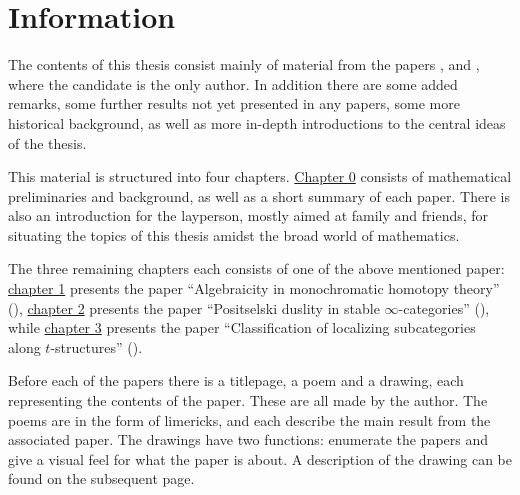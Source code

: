 
\section*{Information}

The contents of this thesis consist mainly of material from the papers \cite{aambo_2024_algebraicity}, \cite{aambo_2024_positselski} and \cite{aambo_2024_localizing}, where the candidate is the only author. In addition there are some added remarks, some further results not yet presented in any papers, some more historical background, as well as more in-depth introductions to the central ideas of the thesis. 

This material is structured into four chapters. \hyperref[ch0]{Chapter 0} consists of mathematical preliminaries and background, as well as a short summary of each paper. There is also an introduction for the layperson, mostly aimed at family and friends, for situating the topics of this thesis amidst the broad world of mathematics. 

The three remaining chapters each consists of one of the above mentioned paper: \hyperref[ch1]{chapter 1} presents the paper ``Algebraicity in monochromatic homotopy theory'' (\cite{aambo_2024_algebraicity}), \hyperref[ch2]{chapter 2} presents the paper ``Positselski duslity in stable $\infty$-categories'' (\cite{aambo_2024_positselski}), while \hyperref[ch3]{chapter 3} presents the paper ``Classification of localizing subcategories along $t$-structures'' (\cite{aambo_2024_localizing}). 

Before each of the papers there is a titlepage, a poem and a drawing, each representing the contents of the paper. These are all made by the author. The poems are in the form of limericks, and each describe the main result from the associated paper. The drawings have two functions: enumerate the papers and give a visual feel for what the paper is about. A description of the drawing can be found on the subsequent page. 

